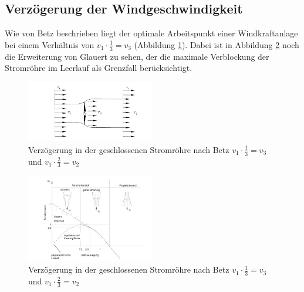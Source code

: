\subsection{Verzögerung der Windgeschwindigkeit}
Wie von Betz beschrieben liegt der optimale Arbeitspunkt einer Windkraftanlage bei einem Verhältnis von $v_{1} \cdot \frac{1}{3}=v_{3}$  (Abbildung \ref{fig:Betz2905}). Dabei ist in Abbildung \ref{fig:Glauert} noch die Erweiterung von Glauert zu sehen, der die maximale Verblockung der Stromröhre im Leerlauf als Grenzfall berücksichtigt.
\begin{figure}[h!]
    \centering
    \includegraphics[width=0.5\textwidth]{Abbildungen/Betz.jpg}
    \caption{Verzögerung in der geschlossenen Stromröhre nach Betz $v_{1} \cdot \frac{1}{3}=v_{3}$ und  $v_{1} \cdot \frac{2}{3}=v_{2} $ \cite{Anleitung}}
    \label{fig:Betz2905}
\end{figure}
\begin{figure}[h!]
    \centering
    \includegraphics[width=0.5\textwidth]{Abbildungen/Glauert.jpg}
    \caption{Verzögerung in der geschlossenen Stromröhre nach Betz $v_{1} \cdot \frac{1}{3}=v_{3}$ und  $v_{1} \cdot \frac{2}{3}=v_{2} $\cite{Anleitung}}
    \label{fig:Glauert}
\end{figure}

